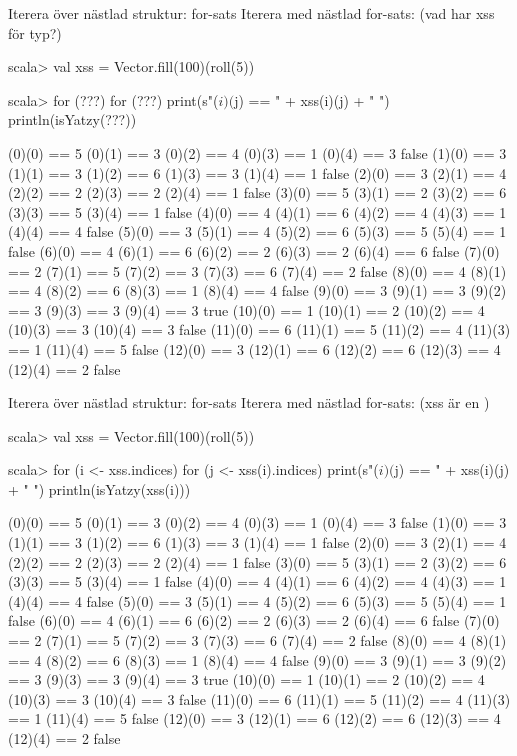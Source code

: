 \begin{Slide}{Iterera över nästlad struktur: for-sats}\SlideFontSmall
Iterera med nästlad for-sats: (vad har xss för typ?)
\begin{REPL}
scala> val xss = Vector.fill(100)(roll(5))

scala> for (???) {
         for (???) {
           print(s"($i)($j) == " + xss(i)(j) + " ")
         }
         println(isYatzy(???))
       }

(0)(0) == 5 (0)(1) == 3 (0)(2) == 4 (0)(3) == 1 (0)(4) == 3 false
(1)(0) == 3 (1)(1) == 3 (1)(2) == 6 (1)(3) == 3 (1)(4) == 1 false
(2)(0) == 3 (2)(1) == 4 (2)(2) == 2 (2)(3) == 2 (2)(4) == 1 false
(3)(0) == 5 (3)(1) == 2 (3)(2) == 6 (3)(3) == 5 (3)(4) == 1 false
(4)(0) == 4 (4)(1) == 6 (4)(2) == 4 (4)(3) == 1 (4)(4) == 4 false
(5)(0) == 3 (5)(1) == 4 (5)(2) == 6 (5)(3) == 5 (5)(4) == 1 false
(6)(0) == 4 (6)(1) == 6 (6)(2) == 2 (6)(3) == 2 (6)(4) == 6 false
(7)(0) == 2 (7)(1) == 5 (7)(2) == 3 (7)(3) == 6 (7)(4) == 2 false
(8)(0) == 4 (8)(1) == 4 (8)(2) == 6 (8)(3) == 1 (8)(4) == 4 false
(9)(0) == 3 (9)(1) == 3 (9)(2) == 3 (9)(3) == 3 (9)(4) == 3 true
(10)(0) == 1 (10)(1) == 2 (10)(2) == 4 (10)(3) == 3 (10)(4) == 3 false
(11)(0) == 6 (11)(1) == 5 (11)(2) == 4 (11)(3) == 1 (11)(4) == 5 false
(12)(0) == 3 (12)(1) == 6 (12)(2) == 6 (12)(3) == 4 (12)(4) == 2 false
\end{REPL}
\end{Slide}

\begin{Slide}{Iterera över nästlad struktur: for-sats}\SlideFontSmall
Iterera med nästlad for-sats: (xss är en )
\begin{REPL}
scala> val xss = Vector.fill(100)(roll(5))

scala> for (i <- xss.indices) {
         for (j <- xss(i).indices) {
           print(s"($i)($j) == " + xss(i)(j) + " ")
         }
         println(isYatzy(xss(i)))
       }

(0)(0) == 5 (0)(1) == 3 (0)(2) == 4 (0)(3) == 1 (0)(4) == 3 false
(1)(0) == 3 (1)(1) == 3 (1)(2) == 6 (1)(3) == 3 (1)(4) == 1 false
(2)(0) == 3 (2)(1) == 4 (2)(2) == 2 (2)(3) == 2 (2)(4) == 1 false
(3)(0) == 5 (3)(1) == 2 (3)(2) == 6 (3)(3) == 5 (3)(4) == 1 false
(4)(0) == 4 (4)(1) == 6 (4)(2) == 4 (4)(3) == 1 (4)(4) == 4 false
(5)(0) == 3 (5)(1) == 4 (5)(2) == 6 (5)(3) == 5 (5)(4) == 1 false
(6)(0) == 4 (6)(1) == 6 (6)(2) == 2 (6)(3) == 2 (6)(4) == 6 false
(7)(0) == 2 (7)(1) == 5 (7)(2) == 3 (7)(3) == 6 (7)(4) == 2 false
(8)(0) == 4 (8)(1) == 4 (8)(2) == 6 (8)(3) == 1 (8)(4) == 4 false
(9)(0) == 3 (9)(1) == 3 (9)(2) == 3 (9)(3) == 3 (9)(4) == 3 true
(10)(0) == 1 (10)(1) == 2 (10)(2) == 4 (10)(3) == 3 (10)(4) == 3 false
(11)(0) == 6 (11)(1) == 5 (11)(2) == 4 (11)(3) == 1 (11)(4) == 5 false
(12)(0) == 3 (12)(1) == 6 (12)(2) == 6 (12)(3) == 4 (12)(4) == 2 false
\end{REPL}
\end{Slide}


